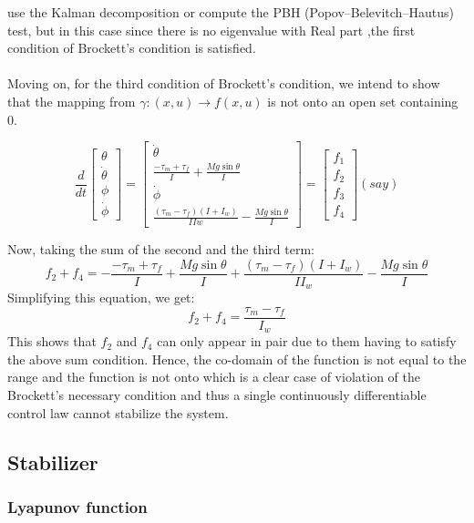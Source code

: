 \documentclass{article}
\begin{document}
use the Kalman decomposition or compute the PBH (Popov–Belevitch–Hautus) test, but in this case
since there is no eigenvalue with Real part ,the first condition of Brockett's condition is satisfied.
\\
\\
Moving on, for the third condition of Brockett's condition, we intend to show that the mapping from 
\( \gamma : (x, u) \to f(x, u) \) is not onto an open set containing 0.
\begin{center}
\[
\frac{d}{dt}
\begin{bmatrix}
\theta \\
\dot{\theta} \\
\phi \\
\dot{\phi} 
\end{bmatrix}
=
\begin{bmatrix}
\dot{\theta} \\
\frac{-\tau_m + \tau_f}{I} + \frac{Mg\sin\theta}{I} \\
\dot{\phi} \\
\frac{(\tau_m - \tau_f)(I + I_w)}{IIw} - \frac{Mg \sin\theta}{I}
\end{bmatrix}
=
\begin{bmatrix}
f_1\\
f_2\\
f_3\\
f_4
\end{bmatrix}
(say)
\]
\end{center}
Now, taking the sum of the second and the third term:
\[
f_2 + f_4 = -\frac{-\tau_m + \tau_f}{I} + \frac{Mg\sin{\theta}}{I} + \frac{(\tau_m - \tau_f)(I + I_w)}{II_w}- \frac{Mg\sin{\theta}}{I}
\]
Simplifying this equation, we get:
\[
f_2 + f_4 = \frac{\tau_m - \tau_f}{I_w}
\]
This shows that \(f_2 \) and \(f_4\) can only appear in pair due to them having to satisfy the above sum condition.
Hence, the co-domain of the function is not equal to the range and the function is not onto which is a clear case of 
violation of the Brockett's necessary condition and thus a single continuously differentiable control law cannot stabilize the system.
\subsection{Stabilizer}

\subsubsection*{Lyapunov function}
\end{document}
